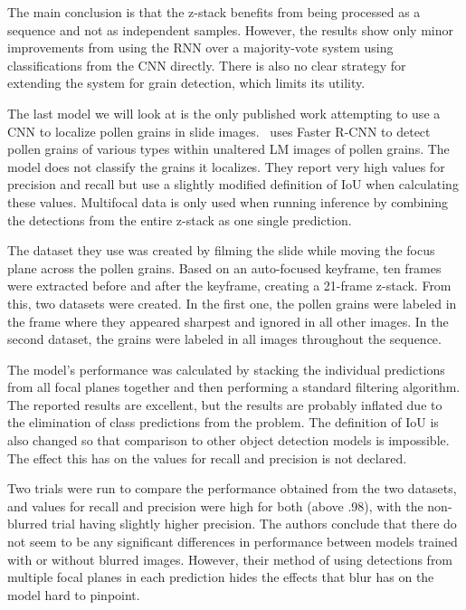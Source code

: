 The main conclusion is that the z-stack benefits from being processed as a sequence and not as independent samples. However, the results show only minor improvements from using the RNN over a majority-vote system using classifications from the CNN directly.
There is also no clear strategy for extending the system for grain detection, which limits its utility.

The last model we will look at is the only published work attempting to use a CNN to localize pollen grains in slide images.\ \textcite{gallardo_caballero_precise_2019} uses Faster R-CNN to detect pollen grains of various types within unaltered LM images of pollen grains.
The model does not classify the grains it localizes.
They report very high values for precision and recall but use a slightly modified definition of IoU when calculating these values.
Multifocal data is only used when running inference by combining the detections from the entire z-stack as one single prediction.

The dataset they use was created by filming the slide while moving the focus plane across the pollen grains.
Based on an auto-focused keyframe, ten frames were extracted before and after the keyframe, creating a 21-frame z-stack.
From this, two datasets were created.
In the first one, the pollen grains were labeled in the frame where they appeared sharpest and ignored in all other images.
In the second dataset, the grains were labeled in all images throughout the sequence.

The model's performance was calculated by stacking the individual predictions from all focal planes together and then performing a standard filtering algorithm.
The reported results are excellent, but the results are probably inflated due to the elimination of class predictions from the problem.
The definition of IoU is also changed so that comparison to other object detection models is impossible.
The effect this has on the values for recall and precision is not declared.

Two trials were run to compare the performance obtained from the two datasets, and values for recall and precision were high for both (above .98), with the non-blurred trial having slightly higher precision.
The authors conclude that there do not seem to be any significant differences in performance between models trained with or without blurred images. However, their method of using detections from multiple focal planes in each prediction hides the effects that blur has on the model hard to pinpoint.

